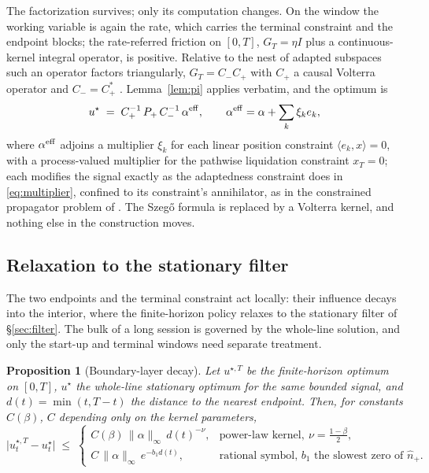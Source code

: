 \documentclass[11pt]{article}
\theoremstyle{plain}
\newtheorem{proposition}{Proposition}
\theoremstyle{definition}
\theoremstyle{remark}
\begin{document}
The factorization survives; only its computation changes. On the window the working variable is again the rate, which carries the terminal constraint and the endpoint blocks; the rate-referred friction on $[0,T]$, $G_T=\eta I$ plus a continuous-kernel integral operator, is positive. Relative to the nest of adapted subspaces such an operator factors triangularly, $G_T=C_-C_+$ with $C_+$ a causal Volterra operator and $C_-=C_+^*$ \citep{GohbergKrein1970,Arveson1975}. Lemma~\ref{lem:pi} applies verbatim, and the optimum is
\begin{equation}\label{eq:finiteT}
u^\star \;=\; C_+^{-1}\,P_+\,C_-^{-1}\,\alpha^{\rm eff},
\qquad \alpha^{\rm eff} = \alpha + \sum_k \xi_k e_k,
\end{equation}
where $\alpha^{\rm eff}$ adjoins a multiplier $\xi_k$ for each linear position constraint $\langle e_k,x\rangle=0$, with a process-valued multiplier for the pathwise liquidation constraint $x_T=0$; each modifies the signal exactly as the adaptedness constraint does in \eqref{eq:multiplier}, confined to its constraint's annihilator, as in the constrained propagator problem of \citet{AbiJaberDeCarvalhoPham2024}. The Szeg\H{o} formula is replaced by a Volterra kernel, and nothing else in the construction moves.

\subsection{Relaxation to the stationary filter}\label{sec:bdrylayer}

The two endpoints and the terminal constraint act locally: their influence decays into the interior, where the finite-horizon policy relaxes to the stationary filter of \S\ref{sec:filter}. The bulk of a long session is governed by the whole-line solution, and only the start-up and terminal windows need separate treatment.

\begin{proposition}[Boundary-layer decay]\label{prop:boundary}
Let $u^{\star,T}$ be the finite-horizon optimum on $[0,T]$, $u^\star$ the whole-line stationary optimum for the same bounded signal, and $d(t)=\min(t,T-t)$ the distance to the nearest endpoint. Then, for constants $C(\beta)$, $C$ depending only on the kernel parameters,
\begin{equation}\label{eq:bdry-decay}
\bigl|u^{\star,T}_t - u^\star_t\bigr| \;\le\;
\begin{cases}
C(\beta)\,\|\alpha\|_\infty\,d(t)^{-\nu}, & \text{power-law kernel},\ \nu=\tfrac{1-\beta}{2},\\[3pt]
C\,\|\alpha\|_\infty\,e^{-b_1 d(t)}, & \text{rational symbol, } b_1 \text{ the slowest zero of } \hat n_+ .
\end{cases}
\end{equation}
\end{proposition}
\end{document}
